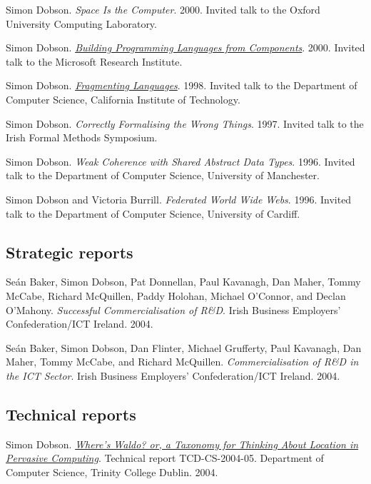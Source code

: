 \documentclass[11pt]{article}
\begin{document}
\label{org8b12206}Simon Dobson.  \emph{Space Is the Computer}. 2000. Invited talk to the Oxford University Computing Laboratory.

\label{org05f8513}Simon Dobson.  \emph{\href{https://simondobson.org/softcopy/vanilla-microsoft-2000.ppt}{Building Programming Languages from Components}}. 2000. Invited talk to the Microsoft Research Institute.

\label{org3f64bfa}Simon Dobson.  \emph{\href{https://simondobson.org/softcopy/vanilla-caltech-1998.ppt}{Fragmenting Languages}}. 1998. Invited talk to the Department of Computer Science, California Institute of Technology.

\label{org1a20efd}Simon Dobson.  \emph{Correctly Formalising the Wrong Things}. 1997. Invited talk to the Irish Formal Methods Symposium.

\label{orgbecc6db}Simon Dobson.  \emph{Weak Coherence with Shared Abstract Data Types}. 1996. Invited talk to the Department of Computer Science, University of Manchester.

\label{org9f3ed4e}Simon Dobson and Victoria Burrill.  \emph{Federated World Wide Webs}. 1996. Invited talk to the Department of Computer Science, University of Cardiff.

\subsection{Strategic reports}
\label{sec:orgb436057}

\label{org2ef955b}Seán Baker, Simon Dobson, Pat Donnellan, Paul Kavanagh, Dan Maher, Tommy McCabe, Richard McQuillen, Paddy Holohan, Michael O’Connor, and Declan O’Mahony.  \emph{Successful Commercialisation of R\&D}. Irish Business Employers’ Confederation/ICT Ireland. 2004.

\label{org88a6816}Seán Baker, Simon Dobson, Dan Flinter, Michael Grufferty, Paul Kavanagh, Dan Maher, Tommy McCabe, and Richard McQuillen.  \emph{Commercialisation of R\&D in the ICT Sector}. Irish Business Employers’ Confederation/ICT Ireland. 2004.

\subsection{Technical reports}
\label{sec:org5f15012}

\label{org20b60de}Simon Dobson.  \emph{\href{https://simondobson.org/softcopy/TCD-CS-2004-05.pdf}{Where’s Waldo? or, a Taxonomy for Thinking About Location in Pervasive Computing}}. Technical report TCD-CS-2004-05. Department of Computer Science, Trinity College Dublin. 2004.
\end{document}

